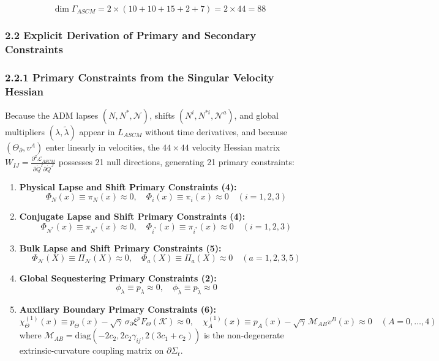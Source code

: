 \documentclass[aps,prd,onecolumn,superscriptaddress,nofootinbib,longbibliography,10pt]{revtex4-2}
\begin{document}
{{  \[ \dim\Gamma_{ASCM} = 2 \times (10 + 10 + 15 + 2 + 7) = 2 \times 44 = 88 \]
  
  
\subsubsection*{2.2 Explicit Derivation of Primary and Secondary Constraints}

  
\subsubsection*{2.2.1 Primary Constraints from the Singular Velocity Hessian}

  Because the ADM lapses \((N, N^*, \mathcal{N})\), shifts \((N^i, N^{*i}, \mathcal{N}^a)\), and global multipliers \((\lambda, \tilde{\lambda})\) appear in \(L_{ASCM}\) without time derivatives, and because \((\Theta_\partial, v^A)\) enter linearly in velocities, the \(44 \times 44\) velocity Hessian matrix \(W_{IJ} = \frac{\partial^2\mathcal{L}_{ASCM}}{\partial\dot{Q}^I\partial\dot{Q}^J}\) possesses 21 null directions, generating 21 primary constraints:


  
\begin{enumerate}
    
\item \textbf{Physical Lapse and Shift Primary Constraints (4):}
    \[ \Phi_N(x) \equiv \pi_N(x) \approx 0, \quad \Phi_i(x) \equiv \pi_i(x) \approx 0 \quad (i = 1,2,3) \]
    
\item \textbf{Conjugate Lapse and Shift Primary Constraints (4):}
    \[ \Phi_{N^*}(x) \equiv \pi_{N^*}(x) \approx 0, \quad \Phi_{i^*}(x) \equiv \pi_{i^*}(x) \approx 0 \quad (i = 1,2,3) \]
    
\item \textbf{Bulk Lapse and Shift Primary Constraints (5):}
    \[ \Phi_{\mathcal{N}}(X) \equiv \Pi_{\mathcal{N}}(X) \approx 0, \quad \Phi_a(X) \equiv \Pi_a(X) \approx 0 \quad (a = 1,2,3,5) \]
    
\item \textbf{Global Sequestering Primary Constraints (2):}
    \[ \phi_\lambda \equiv p_\lambda \approx 0, \quad \phi_{\tilde{\lambda}} \equiv p_{\tilde{\lambda}} \approx 0 \]
    
\item \textbf{Auxiliary Boundary Primary Constraints (6):}
    \[ \chi_\Theta^{(1)}(x) \equiv p_\Theta(x) - \sqrt{\gamma}\,\sigma_\partial\xi^p F_\Theta(\mathcal{K}) \approx 0, \quad \chi_A^{(1)}(x) \equiv p_A(x) - \sqrt{\gamma}\,\mathcal{M}_{AB}v^B(x) \approx 0 \quad (A = 0,\dots,4) \]
    where \(\mathcal{M}_{AB} = \text{diag}(-2c_2, 2c_2\gamma_{ij}, 2(3c_1 + c_2))\) is the non-degenerate extrinsic-curvature coupling matrix on \(\partial\Sigma_t\).
  

\end{enumerate}}}
\end{document}
